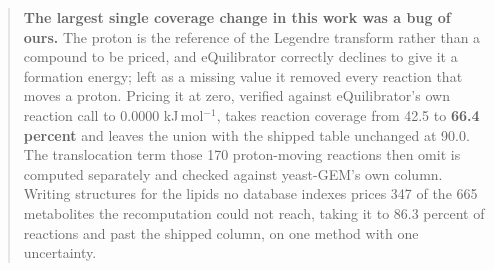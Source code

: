 \documentclass[10pt,a4paper]{article}
\begin{document}
\begin{abstract}
\textbf{The largest single coverage change in this work was a bug of ours.} The proton is
the reference of the Legendre transform rather than a compound to be priced, and
eQuilibrator correctly declines to give it a formation energy; left as a missing value it
removed every reaction that moves a proton. Pricing it at zero, verified against
eQuilibrator's own reaction call to 0.0000 kJ\,mol$^{-1}$, takes reaction coverage from
42.5 to \textbf{66.4 percent} and leaves the union with the shipped table unchanged at
90.0. The translocation term those 170 proton-moving reactions then omit is computed
separately and checked against yeast-GEM's own column. Writing structures for the lipids no
database indexes prices 347 of the 665 metabolites the recomputation could not reach,
taking it to 86.3 percent of reactions and past the shipped column, on one method with one
uncertainty.
\end{abstract}

\vspace{0.5em}
\tccontents
\clearpage











\end{document}
